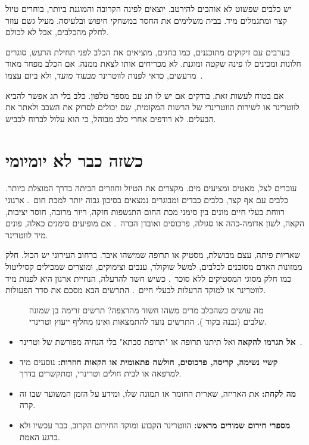 יש כלבים שפשוט לא אוהבים להירטב. יוצאים לפינה הקרובה והמוגנת ביותר, בוחרים טיול קצר ומתגמלים
מיד. בבית משלימים את החסר במשחקי חיפוש ובלעיסה. מעיל גשם עוזר לחלק מהכלבים, אבל לא לכולם.

בערבים עם זיקוקים מתוכננים, כמו בחגים, מוציאים את הכלב לפני תחילת הרעש, סוגרים חלונות ומכינים
לו פינה שקטה ומוגנת. לא מכריחים אותו לצאת ממנה. אם הכלב מפחד מאוד מרעשים, כדאי לפנות לווטרינר
\emph{מבעוד מועד}, ולא ביום עצמו~\cite{rspca-fireworks}.

אם בטוח לעשות זאת, בודקים אם יש לו תג עם מספר טלפון. כלב בלי תג אפשר להביא לווטרינר או לשירות
הווטרינרי של הרשות המקומית, שם יכולים לסרוק את השבב ולאתר את הבעלים. לא רודפים אחרי כלב מבוהל,
כי הוא עלול לברוח לכביש.

\section{כשזה כבר לא יומיומי}

עוברים לצל, מאטים ומציעים מים. מקצרים את הטיול וחוזרים הביתה בדרך המוצלת ביותר. כלבים עם אף
קצר, כלבים כבדים ומבוגרים נמצאים בסיכון גבוה יותר למכת חום~\cite{hall2020}. ארגוני רווחת בעלי
חיים מונים בין סימני מכת החום התנשפות חזקה, ריור מרובה, חוסר יציבות, הקאה, לשון אדומה-כהה
או סגולה, פרכוסים ואובדן הכרה~\cite{humane-heat}. אם מופיעים סימנים כאלה, פונים מיד לווטרינר.

שאריות פיתה, עצם מבושלת, מסטיק או תרופה שמישהו איבד. ברחוב העירוני יש הכול. חלק ממזונות האדם
מסוכנים לכלבים, למשל שוקולד, ענבים וצימוקים, ומוצרים שמכילים קסיליטול כמו חלק מסוגי המסטיקים
ללא סוכר~\cite{aspca-foods}. כשיש חשד להרעלה, הנחיית ארגון  היא לפנות מיד לווטרינר או
למוקד הרעלות לבעלי חיים~\cite{aspca-poisoned}. התרשים הבא מסכם את סדר הפעולות.

\begin{figure}[h]
  \centering
  
  \caption{מה עושים כשהכלב מרים משהו חשוד מהרצפה? תרשים זרימה בן שמונה שלבים (נבנה בקוד ).
  התרשים נועד להתמצאות ואינו מחליף ייעוץ וטרינרי.}
  \label{fig:flow}
\end{figure}

\begin{emergencybox}
\begin{itemize}
  \item \textbf{אל תגרמו להקאה} ואל תיתנו תרופה או "תרופת סבתא" בלי הנחיה מפורשת של וטרינר~\cite{banfield-poison}.
  \item \textbf{קשיי נשימה, קריסה, פרכוסים, חולשה פתאומית או הקאות חוזרות:} נוסעים מיד למרפאה
        או לבית חולים וטרינרי, ומתקשרים בדרך.
  \item \textbf{מה לקחת:} את האריזה, שארית החומר או תמונה שלו, ומידע על הזמן המשוער שבו זה קרה.
  \item \textbf{מספרי חירום שמורים מראש:} הווטרינר הקבוע ומוקד החירום הקרוב, כבר עכשיו ולא ברגע האמת.
\end{itemize}
\end{emergencybox}

